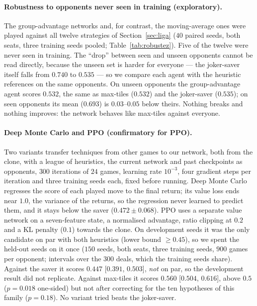\documentclass[11pt]{article}
\begin{document}
\paragraph{Robustness to opponents never seen in training (exploratory).} The group-advantage networks and, for contrast, the moving-average ones were played against all twelve strategies of Section~\ref{sec:liga} ($40$ paired seeds, both seats, three training seeds pooled; Table~\ref{tab:robustez}). Five of the twelve were never seen in training. The ``drop'' between seen and unseen opponents cannot be read directly, because the unseen set is harder for everyone --- the joker-saver itself falls from $0.740$ to $0.535$ --- so we compare each agent with the heuristic references on the same opponents. On unseen opponents the group-advantage agent scores $0.532$, the same as max-tiles ($0.532$) and the joker-saver ($0.535$); on seen opponents its mean ($0.693$) is $0.03$--$0.05$ below theirs. Nothing breaks and nothing improves: the network behaves like max-tiles against everyone.
\begin{table}[h]\centering\small
\caption{Score against each opponent ($\pm$ 95\% CI over seeds; $*$: not seen in training). ``Group $K{=}4$'' and ``Moving avg.'' pool three training seeds. ``Mean'' averages the cells shown; the max-tiles and joker-saver columns lack their own diagonal. The worst case is the minimum cell and is biased downward.}\label{tab:robustez}

\end{table}

\paragraph{Deep Monte Carlo and PPO (confirmatory for PPO).}\label{sec:dmcppo} Two variants transfer techniques from other games to our network, both from the clone, with a league of heuristics, the current network and past checkpoints as opponents, $300$ iterations of $24$ games, learning rate $10^{-3}$, four gradient steps per iteration and three training seeds each, fixed before running. Deep Monte Carlo \cite{zha2021} regresses the score of each played move to the final return; its value loss ends near $1.0$, the variance of the returns, so the regression never learned to predict them, and it stays below the saver ($0.472\pm0.068$). PPO \cite{schulman2017} uses a separate value network on a seven-feature state, a normalised advantage, ratio clipping at $0.2$ and a KL penalty ($0.1$) towards the clone. On development seeds it was the only candidate on par with both heuristics (lower bound $\ge0.45$), so we spent the held-out seeds on it once ($150$ seeds, both seats, three training seeds, $900$ games per opponent; intervals over the $300$ deals, which the training seeds share). Against the saver it scores $0.447$ [$0.391$, $0.503$], \emph{not} on par, so the development result did not replicate. Against max-tiles it scores $0.560$ [$0.504$, $0.616$], above $0.5$ ($p=0.018$ one-sided) but not after correcting for the ten hypotheses of this family ($p=0.18$). No variant tried beats the joker-saver.
\end{document}
